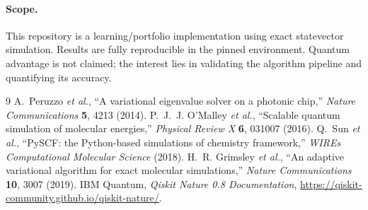 \documentclass[11pt,a4paper]{article}
\begin{document}
\paragraph{Scope.}
This repository is a learning/portfolio implementation using exact statevector
simulation. Results are fully reproducible in the pinned environment.
Quantum advantage is not claimed; the interest lies in validating the
algorithm pipeline and quantifying its accuracy.

\begin{thebibliography}{9}
  A.~Peruzzo \textit{et al.},
  ``A variational eigenvalue solver on a photonic chip,''
  \textit{Nature Communications} \textbf{5}, 4213 (2014).
  P.~J.~J. O'Malley \textit{et al.},
  ``Scalable quantum simulation of molecular energies,''
  \textit{Physical Review X} \textbf{6}, 031007 (2016).
  Q.~Sun \textit{et al.},
  ``PySCF: the Python-based simulations of chemistry framework,''
  \textit{WIREs Computational Molecular Science} (2018).
  H.~R. Grimsley \textit{et al.},
  ``An adaptive variational algorithm for exact molecular simulations,''
  \textit{Nature Communications} \textbf{10}, 3007 (2019).
  IBM Quantum, \textit{Qiskit Nature 0.8 Documentation},
  \url{https://qiskit-community.github.io/qiskit-nature/}.
\end{thebibliography}
\end{document}
